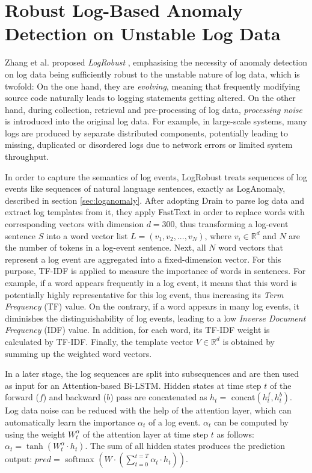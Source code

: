 \section{Robust Log-Based Anomaly Detection on Unstable Log Data\label{sec:logrobust}}
Zhang et al. proposed \textit{LogRobust} \cite{zhang2019robust}, emphasising the necessity of anomaly detection on log data being sufficiently robust to the unstable nature of log data, which is twofold: On the one hand, they are \textit{evolving}, meaning that frequently modifying source code naturally leads to logging statements getting altered. On the other hand, during collection, retrieval and pre-processing of log data, \textit{processing noise} is introduced into the original log data. For example, in large-scale systems, many logs are produced by separate distributed components, potentially leading to missing, duplicated or disordered logs due to network errors or limited system throughput.

In order to capture the semantics of log events, LogRobust treats sequences of log events like sequences of natural language sentences, exactly as LogAnomaly, described in section \ref{sec:loganomaly}. After adopting Drain to parse log data and extract log templates from it, they apply FastText \cite{joulin2016fasttext} in order to replace words with corresponding vectors with dimension $d=300$, thus transforming a log-event sentence $S$ into a word vector list $L = (v_1,v_2,...,v_N)$, where $v_i \in \mathbb{R}^d$ and $N$ are the number of tokens in a log-event sentence. Next, all $N$ word vectors that represent a log event are aggregated into a fixed-dimension vector. For this purpose, TF-IDF is applied to measure the importance of words in sentences. For example, if a word appears frequently in a log event, it means that this word is potentially highly representative for this log event, thus increasing its \textit{Term Frequency} (TF) value. On the contrary, if a word appears in many log events, it diminishes the distinguishability of log events, leading to a low \textit{Inverse Document Frequency} (IDF) value. In addition, for each word, its TF-IDF weight is calculated by TF-IDF. Finally, the template vector $V \in \mathbb{R}^d$ is obtained by summing up the weighted word vectors.

In a later stage, the log sequences are split into subsequences and are then used as input for an Attention-based Bi-LSTM. Hidden states at time step $t$ of the forward ($f$) and backward ($b$) pass are concatenated as $h_t =$ concat$(h_t^f, h_t^b)$. Log data noise can be reduced with the help of the attention layer, which can automatically learn the importance $\alpha_t$ of a log event. $\alpha_t$ can be computed by using the weight $W_t^\alpha$ of the attention layer at time step $t$ as follows: $\alpha_t = \tanh(W^\alpha_t \cdot h_t)$. The sum of all hidden states produces the prediction output: $pred = $ softmax $(W \cdot (\sum_{t=0}^{t=T} \alpha_t \cdot h_t))$.


